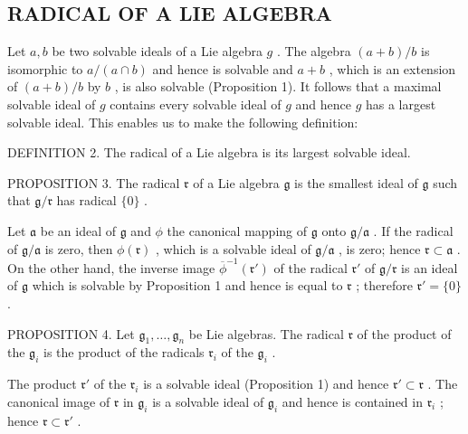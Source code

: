 \subsection{RADICAL OF A LIE ALGEBRA}

Let \(a, b\) be two solvable ideals of a Lie algebra \(g\) . The algebra \((a + b)/b\) is isomorphic to \(a/(a \cap b)\) and hence is solvable and \(a + b\) , which is an extension of \((a + b)/b\) by \(b\) , is also solvable (Proposition 1). It follows that a maximal solvable ideal of \(g\) contains every solvable ideal of \(g\) and hence \(g\) has a largest solvable ideal. This enables us to make the following definition:

DEFINITION 2. The radical of a Lie algebra is its largest solvable ideal.

PROPOSITION 3. The radical \(\mathfrak{r}\) of a Lie algebra \(\mathfrak{g}\) is the smallest ideal of \(\mathfrak{g}\) such that \(\mathfrak{g} / \mathfrak{r}\) has radical \(\{0\}\) .

Let \(\mathfrak{a}\) be an ideal of \(\mathfrak{g}\) and \(\phi\) the canonical mapping of \(\mathfrak{g}\) onto \(\mathfrak{g}/\mathfrak{a}\) . If the radical of \(\mathfrak{g}/\mathfrak{a}\) is zero, then \(\phi(\mathfrak{r})\) , which is a solvable ideal of \(\mathfrak{g}/\mathfrak{a}\) , is zero; hence \(\mathfrak{r} \subset \mathfrak{a}\) . On the other hand, the inverse image \(\overline{\phi}^{-1}(\mathfrak{r}')\) of the radical \(\mathfrak{r}'\) of \(\mathfrak{g}/\mathfrak{r}\) is an ideal of \(\mathfrak{g}\) which is solvable by Proposition 1 and hence is equal to \(\mathfrak{r}\) ; therefore \(\mathfrak{r}' = \{0\}\) .

PROPOSITION 4. Let \(\mathfrak{g}_1, \ldots, \mathfrak{g}_n\) be Lie algebras. The radical \(\mathfrak{r}\) of the product of the \(\mathfrak{g}_i\) is the product of the radicals \(\mathfrak{r}_i\) of the \(\mathfrak{g}_i\) .

The product \(\mathfrak{r}'\) of the \(\mathfrak{r}_i\) is a solvable ideal (Proposition 1) and hence \(\mathfrak{r}' \subset \mathfrak{r}\) . The canonical image of \(\mathfrak{r}\) in \(\mathfrak{g}_i\) is a solvable ideal of \(\mathfrak{g}_i\) and hence is contained in \(\mathfrak{r}_i\) ; hence \(\mathfrak{r} \subset \mathfrak{r}'\) .

